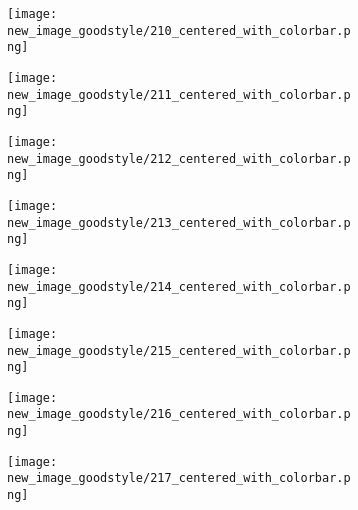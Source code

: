 \documentclass[a4paper,12pt]{article}
\begin{document}
\begin{figure}[H]
  \begin{subfigure}{0.11\textwidth}
    \texttt{[image: new\_image\_goodstyle/210\_centered\_with\_colorbar.png]}
  \end{subfigure}
  \hfill
  \begin{subfigure}{0.11\textwidth}
    \texttt{[image: new\_image\_goodstyle/211\_centered\_with\_colorbar.png]}
  \end{subfigure}
  \hfill
  \begin{subfigure}{0.11\textwidth}
    \texttt{[image: new\_image\_goodstyle/212\_centered\_with\_colorbar.png]}
  \end{subfigure}
  \hfill
  \begin{subfigure}{0.11\textwidth}
    \texttt{[image: new\_image\_goodstyle/213\_centered\_with\_colorbar.png]}
  \end{subfigure}
  \hfill
  \begin{subfigure}{0.11\textwidth}
    \texttt{[image: new\_image\_goodstyle/214\_centered\_with\_colorbar.png]}
  \end{subfigure}
  \hfill
  \begin{subfigure}{0.11\textwidth}
    \texttt{[image: new\_image\_goodstyle/215\_centered\_with\_colorbar.png]}
  \end{subfigure}
  \hfill
  \begin{subfigure}{0.11\textwidth}
    \texttt{[image: new\_image\_goodstyle/216\_centered\_with\_colorbar.png]}
  \end{subfigure}
  \hfill
  \begin{subfigure}{0.11\textwidth}
    \texttt{[image: new\_image\_goodstyle/217\_centered\_with\_colorbar.png]}
  \end{subfigure}
  \hfill
\end{figure}
\end{document}
